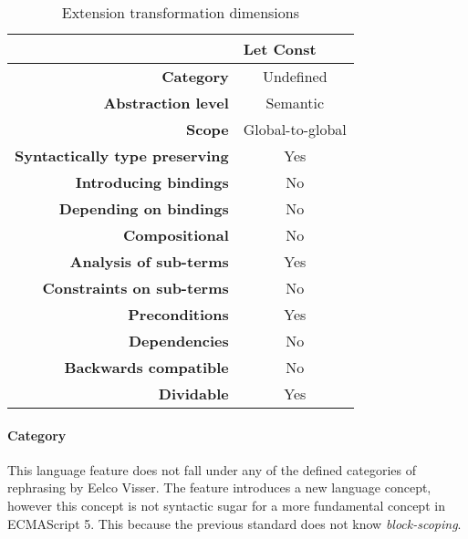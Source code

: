 \begin{table}[h]
\centering
\caption{Extension transformation dimensions}
\label{let-const-table}
\begin{tabular}{@{}rc@{}}
\toprule
                                       & \multicolumn{1}{l}{\textbf{Let Const}} \\ \midrule
\textbf{Category}                      & Undefined
\\
\textbf{Abstraction level}             & Semantic                          \\
\textbf{Scope}                         & Global-to-global                               \\
\textbf{Syntactically type preserving} & Yes                                          \\
\textbf{Introducing bindings}          & No                                          \\%
\textbf{Depending on bindings}         & No                                           \\
\textbf{Compositional}                 & No                                          \\
\textbf{Analysis of sub-terms}          & Yes                                          \\
\textbf{Constraints on sub-terms}       & No                                           \\
\textbf{Preconditions}                 & Yes                                          \\
\textbf{Dependencies}                  & No                                           \\
\textbf{Backwards compatible}          & No                                          \\
\textbf{Dividable}                     & Yes                                           \\ \bottomrule
\end{tabular}
\end{table}

\paragraph{Category}
This language feature does not fall under any of the defined categories of rephrasing by Eelco Visser\cite{Visser2001}. The feature introduces a new language concept, however this concept is not syntactic sugar for a more fundamental concept in ECMAScript 5. This because the previous standard does not know \textit{block-scoping}.

